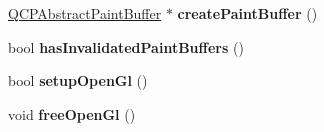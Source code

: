 \begin{DoxyCompactItemize}
\item 
\mbox{\label{class_q_custom_plot_a568ea46e60028b09a874bb1bc2b49847}} 
\hyperlink{class_q_c_p_abstract_paint_buffer}{Q\+C\+P\+Abstract\+Paint\+Buffer} $\ast$ {\bfseries create\+Paint\+Buffer} ()
\item 
\mbox{\label{class_q_custom_plot_ad452b582348c8e99462d83fe1cd0279b}} 
bool {\bfseries has\+Invalidated\+Paint\+Buffers} ()
\item 
\mbox{\label{class_q_custom_plot_a8954c4667c51070ff4e9b02d858fd190}} 
bool {\bfseries setup\+Open\+Gl} ()
\item 
\mbox{\label{class_q_custom_plot_aaa3073362074581a7b5905726b4a0067}} 
void {\bfseries free\+Open\+Gl} ()
\end{DoxyCompactItemize}
